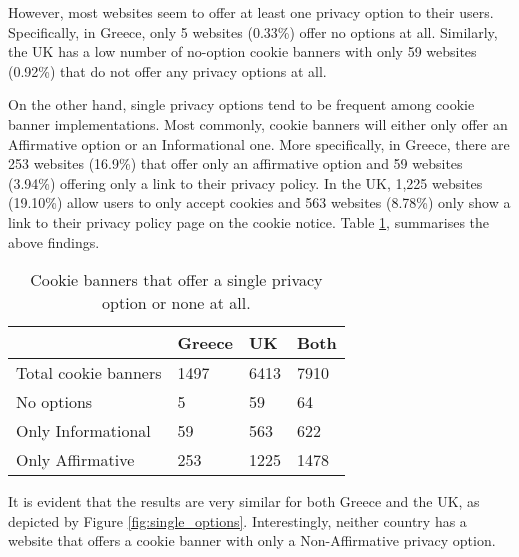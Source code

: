 \documentclass[../main.tex]{subfiles}
\begin{document}
However, most websites seem to offer at least one privacy option to their users. Specifically, in Greece, only 5 websites (0.33\%) offer no options at all. Similarly, the UK has a low number of no-option cookie banners with only 59 websites (0.92\%) that do not offer any privacy options at all. 

On the other hand, single privacy options tend to be frequent among cookie banner implementations. Most commonly, cookie banners will either only offer an Affirmative option or an Informational one. More specifically, in Greece, there are 253 websites (16.9\%) that offer only an affirmative option and 59 websites (3.94\%) offering only a link to their privacy policy. In the UK, 1,225 websites (19.10\%) allow users to only accept cookies and 563 websites (8.78\%) only show a link to their privacy policy page on the cookie notice. Table \ref{tab:no_options_cookie_banners}, summarises the above findings.

\begin{table}[ht]
    \centering
    \begin{tabular}{@{}llll@{}}
        \toprule
                             & Greece & UK   & Both \\ \midrule
        Total cookie banners & 1497   & 6413 & 7910 \\
        No options           & 5      & 59   & 64   \\
        Only Informational   & 59     & 563  & 622  \\ 
        Only Affirmative     & 253    & 1225 & 1478 \\ \bottomrule
    \end{tabular}
    \caption{Cookie banners that offer a single privacy option or none at all.}
    \label{tab:no_options_cookie_banners}
\end{table}

It is evident that the results are very similar for both Greece and the UK, as depicted by Figure \ref{fig:single_options}. Interestingly, neither country has a website that offers a cookie banner with only a Non-Affirmative privacy option.

\dps
\end{document}
